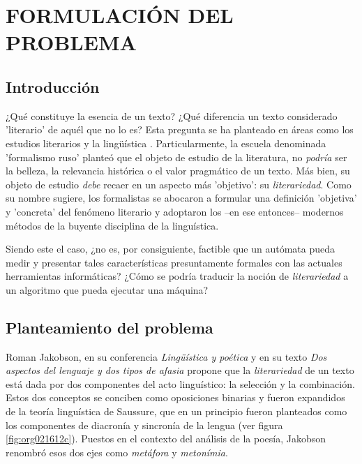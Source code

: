 \documentclass[12pt,letterpaper,twoside]{article}
\begin{document}
\section{FORMULACIÓN DEL PROBLEMA}
\label{sec:orgb562d6e}
\subsection{Introducción}
\label{sec:orgc299919}

¿Qué constituye la esencia de un texto? ¿Qué diferencia un texto
considerado 'literario' de aquél que no lo es? Esta pregunta se ha
planteado en áreas como los estudios literarios y la lingüística
\cite{eijembaum2010teoria}. Particularmente, la escuela denominada
'formalismo ruso' planteó que el objeto de estudio de la literatura,
no \emph{podría} ser la belleza, la relevancia histórica o el valor
pragmático de un texto. Más bien, su objeto de estudio \emph{debe} recaer
en un aspecto más 'objetivo': su \emph{literariedad}.  Como su nombre
sugiere, los formalistas se abocaron a formular una definición
'objetiva' y 'concreta' del fenómeno literario y adoptaron los --en
ese entonces-- modernos métodos de la buyente disciplina de la
linguística.

Siendo este el caso, ¿no es, por consiguiente, factible que un
autómata pueda medir y presentar tales características presuntamente
formales con las actuales herramientas informáticas? ¿Cómo se podría
traducir la noción de \emph{literariedad} a un algoritmo que pueda ejecutar
una máquina?


\subsection{Planteamiento del problema}
\label{sec:org941739e}

Roman Jakobson, en su conferencia \emph{Lingüística y poética}
\cite{jakobson1981linguistica} y en su texto \emph{Dos aspectos del lenguaje y dos
tipos de afasia} \cite{jakobson1956two} propone que la
\emph{literariedad} de un texto está dada por dos componentes del acto
linguístico: la selección y la combinación. Estos dos conceptos se
conciben como oposiciones binarias y fueron expandidos de la
teoría linguística de Saussure, que en un principio fueron
planteados como los componentes de diacronía y sincronía de la
lengua (ver figura \ref{fig:org021612c}). Puestos en el contexto del
análisis de la poesía, Jakobson renombró esos dos ejes como
\emph{metáfora} y \emph{metonímia}.
\end{document}
